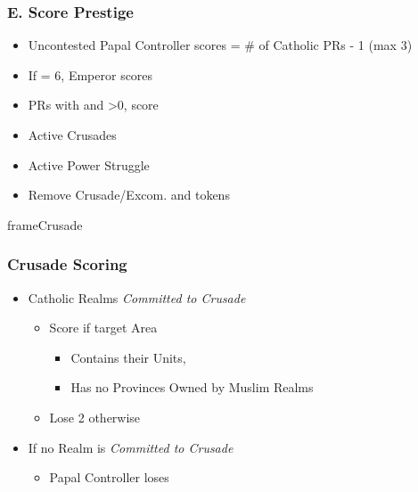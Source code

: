 \documentclass[10pt]{article}
\begin{document}
\subsubsection*{E. Score Prestige}
\begin{itemize}
	\item Uncontested Papal Controller scores \prestige = \# of Catholic PRs - 1 (max 3)
	\item If \authority = 6, Emperor scores 
	\item PRs with  and \stability>0, score 
	\item Active Crusades
	\item Active Power Struggle
	\item Remove Crusade/Excom. and \battlegroundarea tokens
\end{itemize}
\begin{dynamiccontents*}{frameCrusade}
	\subsubsection*{Crusade Scoring }
	\begin{itemize}
		\item Catholic Realms \emph{Committed to Crusade}
		\begin{itemize}
			\item Score  if target Area
			\begin{itemize}
				\item Contains their Units, 
				\item Has no Provinces Owned by Muslim Realms
			\end{itemize}
			\item Lose 2 otherwise
		\end{itemize}
		\item If no Realm is \emph{Committed to Crusade}
		\begin{itemize}
			\item Papal Controller loses 
		\end{itemize}
	\end{itemize}
\end{dynamiccontents*}
\end{document}
